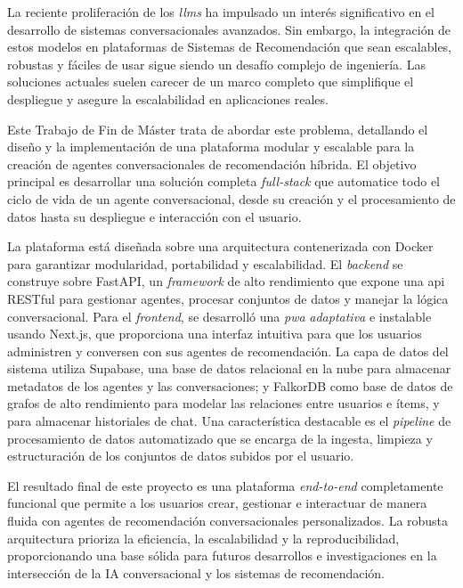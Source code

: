 La reciente proliferación de los \textit{\acp{llm}} ha impulsado un interés significativo en el desarrollo de sistemas conversacionales avanzados. Sin embargo, la integración de estos modelos en plataformas de Sistemas de Recomendación que sean escalables, robustas y fáciles de usar sigue siendo un desafío complejo de ingeniería. Las soluciones actuales suelen carecer de un marco completo que simplifique el despliegue y asegure la escalabilidad en aplicaciones reales.

Este Trabajo de Fin de Máster trata de abordar este problema, detallando el diseño y la implementación de una plataforma modular y escalable para la creación de agentes conversacionales de recomendación híbrida. El objetivo principal es desarrollar una solución completa \textit{full-stack} que automatice todo el ciclo de vida de un agente conversacional, desde su creación y el procesamiento de datos hasta su despliegue e interacción con el usuario.

La plataforma está diseñada sobre una arquitectura contenerizada con Docker para garantizar modularidad, portabilidad y escalabilidad. El \textit{backend} se construye sobre FastAPI, un \textit{framework} de alto rendimiento que expone una \ac{api} RESTful para gestionar agentes, procesar conjuntos de datos y manejar la lógica conversacional. Para el \textit{frontend}, se desarrolló una \textit{\ac{pwa}} \textit{adaptativa} e instalable usando Next.js, que proporciona una interfaz intuitiva para que los usuarios administren y conversen con sus agentes de recomendación. La capa de datos del sistema utiliza Supabase, una base de datos relacional en la nube para almacenar metadatos de los agentes y las conversaciones; y FalkorDB como base de datos de grafos de alto rendimiento para modelar las relaciones entre usuarios e ítems, y para almacenar historiales de chat. Una característica destacable es el \textit{pipeline} de procesamiento de datos automatizado que se encarga de la ingesta, limpieza y estructuración de los conjuntos de datos subidos por el usuario.

El resultado final de este proyecto es una plataforma \textit{end-to-end} completamente funcional que permite a los usuarios crear, gestionar e interactuar de manera fluida con agentes de recomendación conversacionales personalizados. La robusta arquitectura prioriza la eficiencia, la escalabilidad y la reproducibilidad, proporcionando una base sólida para futuros desarrollos e investigaciones en la intersección de la IA conversacional y los sistemas de recomendación.

